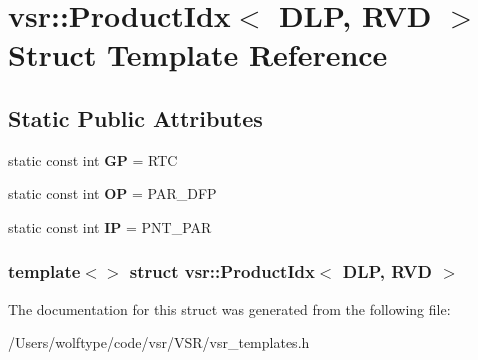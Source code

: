\hypertarget{structvsr_1_1_product_idx_3_01_d_l_p_00_01_r_v_d_01_4}{\section{vsr\-:\-:Product\-Idx$<$ D\-L\-P, R\-V\-D $>$ Struct Template Reference}
\label{structvsr_1_1_product_idx_3_01_d_l_p_00_01_r_v_d_01_4}
}
\subsection*{Static Public Attributes}
\begin{DoxyCompactItemize}
\item 
\hypertarget{structvsr_1_1_product_idx_3_01_d_l_p_00_01_r_v_d_01_4_a4808a411e4db9fd0fe54b2a6fbaceb0b}{static const int {\bfseries G\-P} = R\-T\-C}\label{structvsr_1_1_product_idx_3_01_d_l_p_00_01_r_v_d_01_4_a4808a411e4db9fd0fe54b2a6fbaceb0b}

\item 
\hypertarget{structvsr_1_1_product_idx_3_01_d_l_p_00_01_r_v_d_01_4_a976e1407c9f9e72dc1a10cfb2cb406f4}{static const int {\bfseries O\-P} = P\-A\-R\-\_\-\-D\-F\-P}\label{structvsr_1_1_product_idx_3_01_d_l_p_00_01_r_v_d_01_4_a976e1407c9f9e72dc1a10cfb2cb406f4}

\item 
\hypertarget{structvsr_1_1_product_idx_3_01_d_l_p_00_01_r_v_d_01_4_a95774b9b2169b921a019c3b254e58cec}{static const int {\bfseries I\-P} = P\-N\-T\-\_\-\-P\-A\-R}\label{structvsr_1_1_product_idx_3_01_d_l_p_00_01_r_v_d_01_4_a95774b9b2169b921a019c3b254e58cec}

\end{DoxyCompactItemize}
\subsubsection*{template$<$$>$ struct vsr\-::\-Product\-Idx$<$ D\-L\-P, R\-V\-D $>$}



The documentation for this struct was generated from the following file\-:\begin{DoxyCompactItemize}
\item 
/\-Users/wolftype/code/vsr/\-V\-S\-R/vsr\-\_\-templates.\-h\end{DoxyCompactItemize}
